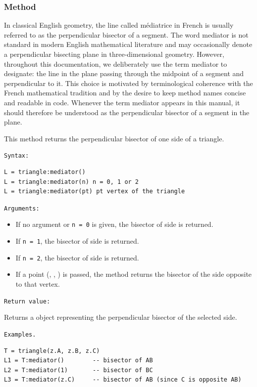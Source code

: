 \subsubsection{Method }
\label{ssub:triangle_mediator}
In classical English geometry, the line called médiatrice in French is usually referred to as the perpendicular bisector of a segment.
The word mediator is not standard in modern English mathematical literature and may occasionally denote a perpendicular bisecting plane in three-dimensional geometry.
However, throughout this documentation, we deliberately use the term mediator to designate:
the line in the plane passing through the midpoint of a segment and perpendicular to it.
This choice is motivated by terminological coherence with the French mathematical tradition and by the desire to keep method names concise and readable in code.
Whenever the term mediator appears in this manual, it should therefore be understood as the perpendicular bisector of a segment in the plane.


This method returns the perpendicular bisector of one side of a triangle.

\texttt{Syntax: }

\begin{verbatim}
L = triangle:mediator()
L = triangle:mediator(n) n = 0, 1 or 2
L = triangle:mediator(pt) pt vertex of the triangle
\end{verbatim}

\texttt{Arguments: }

\begin{itemize}
  \item If no argument or \texttt{n = 0} is given, the bisector of side  is returned.
  \item If \texttt{n = 1}, the bisector of side  is returned.
  \item If \texttt{n = 2}, the bisector of side  is returned.
  \item If a point (, , ) is passed, the method returns the bisector of the side opposite to that vertex.
\end{itemize}

\texttt{Return value: }

Returns a  object representing the perpendicular bisector of the selected side.

\texttt{Examples.}

\begin{mybox}
\begin{verbatim}
T = triangle(z.A, z.B, z.C)
L1 = T:mediator()        -- bisector of AB
L2 = T:mediator(1)       -- bisector of BC
L3 = T:mediator(z.C)     -- bisector of AB (since C is opposite AB)
\end{verbatim}
\end{mybox}


